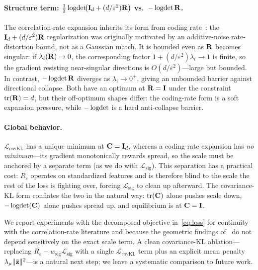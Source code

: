 \paragraph{Structure term: $\tfrac{1}{2}\operatorname{logdet}\!\bigl(\mathbf{I}_d + (d/\varepsilon^2)\mathbf{R}\bigr)$ vs.~$-\operatorname{logdet}\mathbf{R}$.}
The correlation-rate expansion inherits its form from coding rate~\citep{yu2020mcr2, wu2025simdino}: the $\mathbf{I}_d + (d/\varepsilon^2)\mathbf{R}$ regularization was originally motivated by an additive-noise rate-distortion bound, not as a Gaussian match. It is bounded even as $\mathbf{R}$ becomes singular: if $\lambda_i(\mathbf{R}) \to 0$, the corresponding factor $1 + (d/\varepsilon^2)\lambda_i \to 1$ is finite, so the gradient resisting near-singular directions is $O(d/\varepsilon^2)$---large but bounded. In contrast, $-\operatorname{logdet}\mathbf{R}$ diverges as $\lambda_i \to 0^+$, giving an unbounded barrier against directional collapse. Both have an optimum at $\mathbf{R} = \mathbf{I}$ under the constraint $\operatorname{tr}(\mathbf{R}) = d$, but their off-optimum shapes differ: the coding-rate form is a soft expansion pressure, while $-\operatorname{logdet}$ is a hard anti-collapse barrier.

\paragraph{Global behavior.}
$\mathcal{L}_\text{covKL}$ has a unique minimum at $\mathbf{C} = \mathbf{I}_d$, whereas a coding-rate expansion has \emph{no minimum}---its gradient monotonically rewards spread, so the scale must be anchored by a separate term (as we do with $\mathcal{L}_\text{sig}$). This separation has a practical cost: $R_\varepsilon$ operates on standardized features and is therefore blind to the scale the rest of the loss is fighting over, forcing $\mathcal{L}_\text{sig}$ to clean up afterward. The covariance-KL form conflates the two in the natural way: $\operatorname{tr}(\mathbf{C})$ alone pushes scale down, $-\operatorname{logdet}(\mathbf{C})$ alone pushes spread up, and equilibrium is at $\mathbf{C} = \mathbf{I}$.

We report experiments with the decomposed objective in~\eqref{eq:loss} for continuity with the correlation-rate literature and because the geometric findings of~ do not depend sensitively on the exact scale term. A clean covariance-KL ablation---replacing $R_\varepsilon - w_\text{sig}\mathcal{L}_\text{sig}$ with a single $\mathcal{L}_\text{covKL}$ term plus an explicit mean penalty $\lambda_\mu \|\bar{\mathbf{z}}\|^2$---is a natural next step; we leave a systematic comparison to future work.

